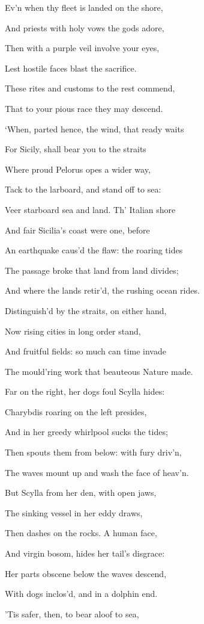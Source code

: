 Ev’n when thy fleet is landed on the shore,

And priests with holy vows the gods adore,

Then with a purple veil involve your eyes,

Lest hostile faces blast the sacrifice.

These rites and customs to the rest commend,

That to your pious race they may descend.

‘When, parted hence, the wind, that ready waits

For Sicily, shall bear you to the straits

Where proud Pelorus opes a wider way,

Tack to the larboard, and stand off to sea:

Veer starboard sea and land. Th’ Italian shore

And fair Sicilia’s coast were one, before

An earthquake caus’d the flaw: the roaring tides

The passage broke that land from land divides;

And where the lands retir’d, the rushing ocean rides.

Distinguish’d by the straits, on either hand,

Now rising cities in long order stand,

And fruitful fields: so much can time invade

The mould’ring work that beauteous Nature made.

Far on the right, her dogs foul Scylla hides:

Charybdis roaring on the left presides,

And in her greedy whirlpool sucks the tides;

Then spouts them from below: with fury driv’n,

The waves mount up and wash the face of heav’n.

But Scylla from her den, with open jaws,

The sinking vessel in her eddy draws,

Then dashes on the rocks. A human face,

And virgin bosom, hides her tail’s disgrace:

Her parts obscene below the waves descend,

With dogs inclos’d, and in a dolphin end.

’Tis safer, then, to bear aloof to sea,

